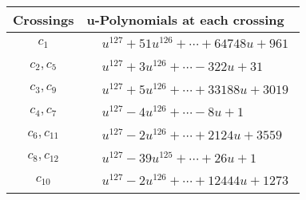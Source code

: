 \documentclass[1p]{elsarticle_modified}
\theoremstyle{definition}
\begin{document}
\begin{tabular}{m{50pt}|m{274pt}}
Crossings & \hspace{64pt}u-Polynomials at each crossing \\
\hline $$\begin{aligned}c_{1}\end{aligned}$$&$\begin{aligned}
&u^{127}+51 u^{126}+\cdots+64748 u+961
\end{aligned}$\\
\hline $$\begin{aligned}c_{2},c_{5}\end{aligned}$$&$\begin{aligned}
&u^{127}+3 u^{126}+\cdots-322 u+31
\end{aligned}$\\
\hline $$\begin{aligned}c_{3},c_{9}\end{aligned}$$&$\begin{aligned}
&u^{127}+5 u^{126}+\cdots+33188 u+3019
\end{aligned}$\\
\hline $$\begin{aligned}c_{4},c_{7}\end{aligned}$$&$\begin{aligned}
&u^{127}-4 u^{126}+\cdots-8 u+1
\end{aligned}$\\
\hline $$\begin{aligned}c_{6},c_{11}\end{aligned}$$&$\begin{aligned}
&u^{127}-2 u^{126}+\cdots+2124 u+3559
\end{aligned}$\\
\hline $$\begin{aligned}c_{8},c_{12}\end{aligned}$$&$\begin{aligned}
&u^{127}-39 u^{125}+\cdots+26 u+1
\end{aligned}$\\
\hline $$\begin{aligned}c_{10}\end{aligned}$$&$\begin{aligned}
&u^{127}-2 u^{126}+\cdots+12444 u+1273
\end{aligned}$\\
\hline
\end{tabular}\\~\\
\end{document}
